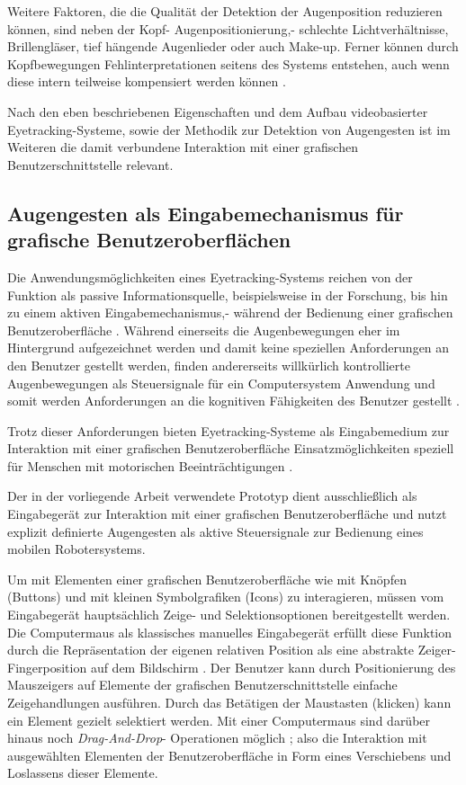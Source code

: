 Weitere Faktoren, die die Qualität der Detektion der Augenposition reduzieren können, sind neben der Kopf- \bzw Augenpositionierung,- schlechte Lichtverhältnisse, Brillengläser, tief hängende Augenlieder oder auch Make-up. Ferner können durch Kopfbewegungen Fehlinterpretationen seitens des Systems entstehen, auch wenn diese intern teilweise kompensiert werden können \cite{SMI2011}.

Nach den eben beschriebenen Eigenschaften und dem Aufbau videobasierter Eyetracking-Systeme, sowie der Methodik zur Detektion von Augengesten ist im Weiteren die damit verbundene Interaktion mit einer grafischen Benutzerschnittstelle relevant. 

\subsection{Augengesten als Eingabemechanismus für grafische Benutzer\-ober\-flächen}
\label{subsection:eingabemech}

Die Anwendungsmöglichkeiten eines Eyetracking-Systems reichen von der Funktion als passive Informationsquelle, beispielsweise in der Forschung, bis hin zu einem aktiven Eingabemechanismus,- \zB während der Bedienung einer grafischen Benutzeroberfläche \cite{majaranta2011,Majaranta2014}. Während einerseits die Augenbewegungen eher im Hintergrund aufgezeichnet werden und damit keine speziellen Anforderungen an den Benutzer gestellt werden, finden andererseits willkürlich kontrollierte Augenbewegungen als Steuersignale für ein Computersystem Anwendung und somit werden Anforderungen an die kognitiven Fähigkeiten des Benutzer gestellt \cite{majaranta2011,Majaranta2014}. 

Trotz dieser Anforderungen bieten Eyetracking-Systeme als Eingabemedium zur Interaktion mit einer grafischen Benutzeroberfläche Einsatzmöglichkeiten speziell für Menschen mit motorischen Beeinträchtigungen \cite{Majaranta2014,Eidam2015,Eidam2016}. 

Der in der vorliegende Arbeit verwendete Prototyp dient ausschließlich als Eingabegerät zur Interaktion mit einer grafischen Benutzeroberfläche und nutzt explizit definierte Augengesten als aktive Steuersignale zur Bedienung eines mobilen Robotersystems. 

Um mit Elementen einer grafischen Benutzeroberfläche wie \zB mit Knöpfen (Buttons) und mit kleinen Symbolgrafiken (Icons) zu interagieren, müssen vom Eingabegerät hauptsächlich Zeige- und Selektionsoptionen bereitgestellt werden. Die Computermaus als klassisches manuelles Eingabegerät erfüllt diese Funktion durch die Repräsentation der eigenen relativen Position als eine abstrakte Zeiger- \bzw Fingerposition auf dem Bildschirm \cite{Peters2013}. Der Benutzer kann durch Positionierung des Mauszeigers auf Elemente der grafischen Benutzerschnittstelle einfache Zeigehandlungen ausführen. Durch das Betätigen der Maustasten (klicken) kann ein Element gezielt selektiert werden. Mit einer Computermaus sind darüber hinaus noch \textit{Drag-And-Drop}- Operationen möglich \cite{Peters2013}; also die Interaktion mit ausgewählten Elementen der Benutzeroberfläche in Form eines Verschiebens und Loslassens dieser Elemente.

